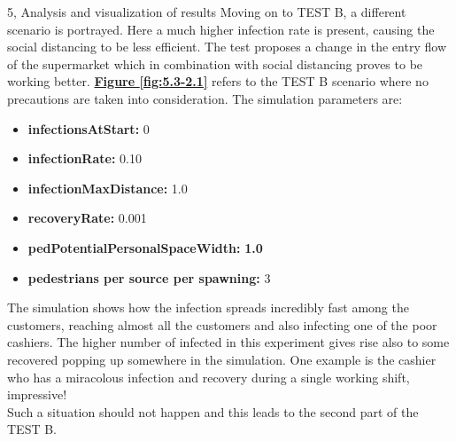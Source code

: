 \documentclass[10pt,a4paper]{article}
\begin{document}
\begin{task}{5, Analysis and visualization of results}
Moving on to TEST B, a different scenario is portrayed. Here a much higher infection rate is present, causing the social distancing to be less efficient. The test proposes a change in the entry flow of the supermarket which in combination with social distancing proves to be working better.
\textbf{\hyperref[fig:5.3-2.1]{Figure \ref{fig:5.3-2.1}}} refers to the TEST B scenario where no precautions are taken into consideration. The simulation parameters are:
\begin{itemize}
    \item \textbf{infectionsAtStart:} 0
    \item \textbf{infectionRate:} 0.10
    \item \textbf{infectionMaxDistance:} 1.0
    \item \textbf{recoveryRate:} 0.001
    \item \textbf{pedPotentialPersonalSpaceWidth:} \textbf{1.0}
    \item \textbf{pedestrians per source per spawning:} 3
\end{itemize}
The simulation shows how the infection spreads incredibly fast among the customers, reaching almost all the customers and also infecting one of the poor cashiers. The higher number of infected in this experiment gives rise also to some recovered popping up somewhere in the simulation. One example is the cashier who has a miracolous infection and recovery during a single working shift, impressive!\\
Such a situation should not happen and this leads to the second part of the TEST B.


\end{task}
\end{document}
